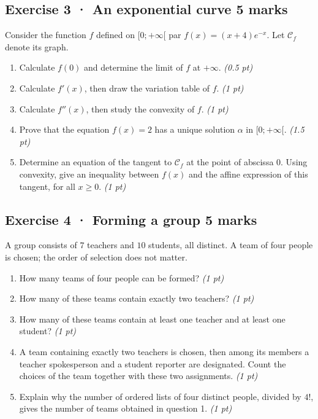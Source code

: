 \clearpage{}\par

\subsection*{Exercise 3 · An exponential curve \hfill 5 marks}Consider the function $f$ defined on $[0;+\infty[$ par $f(x)=(x+4)e^{-x}$. Let $\mathcal C_f$ denote its graph.

\begin{enumerate}

\item Calculate $f(0)$ and determine the limit of $f$ at $+\infty$. \hfill\textit{(0.5 pt)}

\item Calculate $f'(x)$, then draw the variation table of $f$. \hfill\textit{(1 pt)}

\item Calculate $f''(x)$, then study the convexity of $f$. \hfill\textit{(1 pt)}

\item Prove that the equation $f(x)=2$ has a unique solution $\alpha$ in $[0;+\infty[$. \hfill\textit{(1.5 pt)}

\item Determine an equation of the tangent to $\mathcal C_f$ at the point of abscissa $0$. Using convexity, give an inequality between $f(x)$ and the affine expression of this tangent, for all $x\ge0$. \hfill\textit{(1 pt)}

\end{enumerate}

\subsection*{Exercise 4 · Forming a group \hfill 5 marks}A group consists of $7$ teachers and $10$ students, all distinct. A team of four people is chosen; the order of selection does not matter.

\begin{enumerate}

\item How many teams of four people can be formed? \hfill\textit{(1 pt)}

\item How many of these teams contain exactly two teachers? \hfill\textit{(1 pt)}

\item How many of these teams contain at least one teacher and at least one student? \hfill\textit{(1 pt)}

\item A team containing exactly two teachers is chosen, then among its members a teacher spokesperson and a student reporter are designated. Count the choices of the team together with these two assignments. \hfill\textit{(1 pt)}

\item Explain why the number of ordered lists of four distinct people, divided by $4!$, gives the number of teams obtained in question 1. \hfill\textit{(1 pt)}

\end{enumerate}

